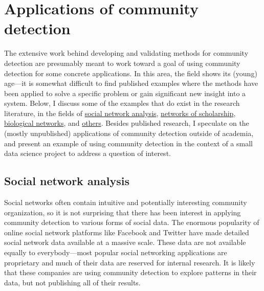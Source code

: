 \section{Applications of community
detection}\label{applications-of-community-detection}

The extensive work behind developing and validating methods for
community detection are presumably meant to work toward a goal of using
community detection for some concrete applications. In this area, the
field shows its (young) age---it is somewhat difficult to find published
examples where the methods have been applied to solve a specific problem
or gain significant new insight into a system. Below, I discuss some of
the examples that do exist in the research literature, in the fields of
\protect\hyperlink{social-network-analysis}{social network analysis},
\protect\hyperlink{networks-of-scholarship}{networks of scholarship},
\protect\hyperlink{biological-networks}{biological networks}, and
\protect\hyperlink{other-research}{others}. Besides published research,
I speculate on the (mostly unpublished) applications of community
detection outside of academia, and present an example of using community
detection in the context of a small data science project to address a
question of interest.

\hypertarget{social-network-analysis}{\subsection{Social network
analysis}\label{social-network-analysis}}

Social networks often contain intuitive and potentially interesting
community organization, so it is not surprising that there has been
interest in applying community detection to various forms of social
data. The enormous popularity of online social network platforms like
Facebook and Twitter have made detailed social network data available at
a massive scale. These data are not available equally to
everybody---most popular social networking applications are proprietary
and much of their data are reserved for internal research. It is likely
that these companies are using community detection to explore patterns
in their data, but not publishing all of their results.

